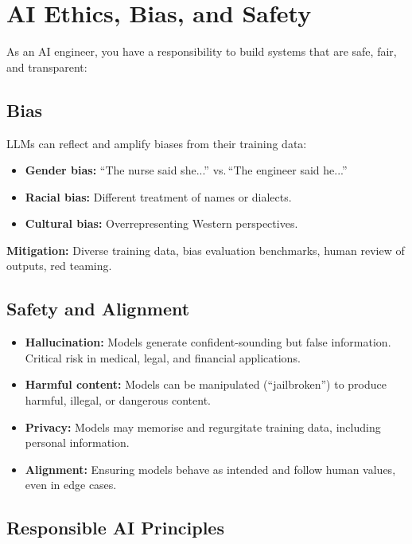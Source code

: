 \documentclass[12pt, a4paper, oneside]{book}
\begin{document}
\section{AI Ethics, Bias, and Safety}

As an AI engineer, you have a responsibility to build systems that are safe, fair, and transparent:

\subsection{Bias}

LLMs can reflect and amplify biases from their training data:
\begin{itemize}[leftmargin=2em]
    \item \textbf{Gender bias:} ``The nurse said she...'' vs.\,``The engineer said he...''
    \item \textbf{Racial bias:} Different treatment of names or dialects.
    \item \textbf{Cultural bias:} Overrepresenting Western perspectives.
\end{itemize}

\textbf{Mitigation:} Diverse training data, bias evaluation benchmarks, human review of outputs, red teaming.

\subsection{Safety and Alignment}

\begin{itemize}[leftmargin=2em]
    \item \textbf{Hallucination:} Models generate confident-sounding but false information. Critical risk in medical, legal, and financial applications.
    \item \textbf{Harmful content:} Models can be manipulated (``jailbroken'') to produce harmful, illegal, or dangerous content.
    \item \textbf{Privacy:} Models may memorise and regurgitate training data, including personal information.
    \item \textbf{Alignment:} Ensuring models behave as intended and follow human values, even in edge cases.
\end{itemize}

\subsection{Responsible AI Principles}
\end{document}
